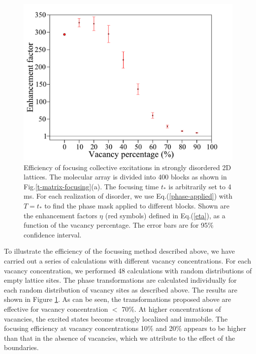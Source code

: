 \begin{figure}[htbp]
\centering
\includegraphics[width=\linewidth]{enhancement-vs-vacancy-t-matrix-other.pdf}
\caption{Efficiency of focusing collective excitations in strongly disordered 2D lattices. The molecular 
array  is divided into 400 blocks as shown in Fig.\ref{t-matrix-focusing}(a). The focusing time $t_*$ is arbitrarily set to 4 ms. For each 
realization of disorder, we use Eq.(\ref{phase-applied}) with $T=t_*$ to find the phase mask applied to different blocks. 
Shown are the enhancement factors $\eta$ (red symbols) defined in Eq.(\ref{eta}), as a function of the vacancy percentage.
 The error bars are for 95\% confidence interval.
} 
\label{enhancement-vs-vacancy-t-matrix}
\end{figure}


To illustrate the efficiency of the focussing method described above, we have carried out a series of calculations 
with different vacancy concentrations. For each vacancy concentration, we performed 48 calculations with random
 distributions of empty lattice sites. The phase transformations are calculated individually for each random 
distribution of vacancy sites as described above. The results are shown in Figure \ref{enhancement-vs-vacancy-t-matrix}. 
As can be seen, the transformations proposed above are effective for vacancy concentration $<$ 70\%. At higher 
concentrations of vacancies, the excited states become strongly localized and immobile. The focusing efficiency at
vacancy concentrations 10\% and 20\% appears to be higher than that in the absence of vacancies, which we attribute to the effect of 
the boundaries.


